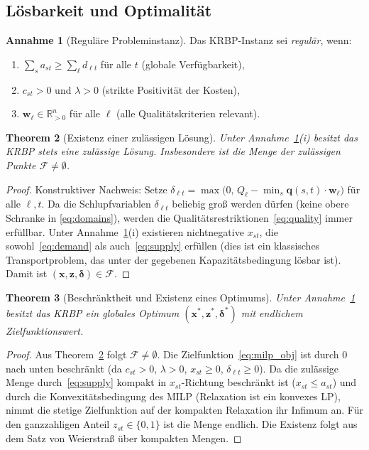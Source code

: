 \documentclass[a4paper, 12pt, twoside, openright]{report}
\newtheorem{theorem}{Theorem}[section]
\theoremstyle{definition}
\newtheorem{assumption}[theorem]{Annahme}
\theoremstyle{definition}
\begin{document}
\subsection{Lösbarkeit und Optimalität}

\begin{assumption}[Reguläre Probleminstanz]
	\label{ass:regular}
	Das KRBP-Instanz sei \emph{regulär}, wenn:
	\begin{enumerate}[label=(\roman*)]
		\item $\sum_{s} a_{st} \geq \sum_\ell d_{\ell t}$ für alle $t$
		(globale Verfügbarkeit),
		\item $c_{st} > 0$ und $\lambda > 0$ (strikte Positivität der Kosten),
		\item $\mathbf{w}_\ell \in \mathbb{R}_{>0}^n$ für alle $\ell$
		(alle Qualitätskriterien relevant).
	\end{enumerate}
\end{assumption}

\begin{theorem}[Existenz einer zulässigen Lösung]
	\label{thm:feasible}
	Unter Annahme~\ref{ass:regular}(i) besitzt das KRBP stets eine zulässige
	Lösung. Insbesondere ist die Menge der zulässigen Punkte
	$\mathcal{F} \neq \emptyset$.
\end{theorem}

\begin{proof}
	Konstruktiver Nachweis: Setze $\delta_{\ell t} = \max\bigl(0,\,
	Q_\ell - \min_s \mathbf{q}(s,t)\cdot\mathbf{w}_\ell\bigr)$ für alle
	$\ell, t$. Da die Schlupfvariablen $\delta_{\ell t}$ beliebig groß
	werden dürfen (keine obere Schranke in \eqref{eq:domains}), werden
	die Qualitätsrestriktionen~\eqref{eq:quality} immer erfüllbar.
	Unter Annahme~\ref{ass:regular}(i) existieren nichtnegative $x_{st}$,
	die sowohl~\eqref{eq:demand} als auch~\eqref{eq:supply} erfüllen
	(dies ist ein klassisches Transportproblem, das unter der gegebenen
	Kapazitätsbedingung lösbar ist). Damit ist $(\mathbf{x},\mathbf{z},
	\boldsymbol{\delta}) \in \mathcal{F}$.
\end{proof}

\begin{theorem}[Beschränktheit und Existenz eines Optimums]
	\label{thm:bounded}
	Unter Annahme~\ref{ass:regular} besitzt das KRBP ein globales Optimum
	$(\mathbf{x}^*, \mathbf{z}^*, \boldsymbol{\delta}^*)$ mit endlichem
	Zielfunktionswert.
\end{theorem}

\begin{proof}
	Aus Theorem~\ref{thm:feasible} folgt $\mathcal{F} \neq \emptyset$.
	Die Zielfunktion~\eqref{eq:milp_obj} ist durch 0 nach unten beschränkt
	(da $c_{st} > 0$, $\lambda > 0$, $x_{st} \geq 0$, $\delta_{\ell t}
	\geq 0$). Da die zulässige Menge durch~\eqref{eq:supply} kompakt in
	$x_{st}$-Richtung beschränkt ist ($x_{st} \leq a_{st}$) und durch die
	Konvexitätsbedingung des MILP (Relaxation ist ein konvexes LP), nimmt
	die stetige Zielfunktion auf der kompakten Relaxation ihr Infimum an.
	Für den ganzzahligen Anteil $z_{st} \in \{0,1\}$ ist die Menge endlich.
	Die Existenz folgt aus dem Satz von Weierstraß über kompakten Mengen.
\end{proof}
\end{document}

